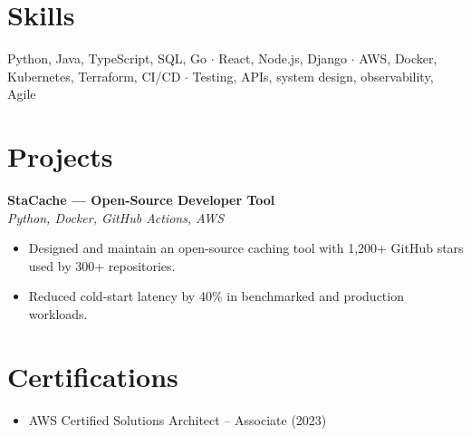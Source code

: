 \documentclass[10pt,letterpaper]{article}
\begin{document}
\section{Skills}
\noindent Python, Java, TypeScript, SQL, Go  $\cdot$  React, Node.js, Django  $\cdot$  AWS, Docker, Kubernetes, Terraform, CI/CD  $\cdot$  Testing, APIs, system design, observability, Agile

\section{Projects}
\noindent\textbf{StaCache --- Open-Source Developer Tool}\\[1pt]
{\small\textit{Python, Docker, GitHub Actions, AWS}}
\begin{itemize}
\item Designed and maintain an open-source caching tool with 1,200+ GitHub stars used by 300+ repositories.
\item Reduced cold-start latency by 40\% in benchmarked and production workloads.
\end{itemize}
\vspace{5pt}
\section{Certifications}
\begin{itemize}
\item AWS Certified Solutions Architect -- Associate (2023)
\end{itemize}
\end{document}

